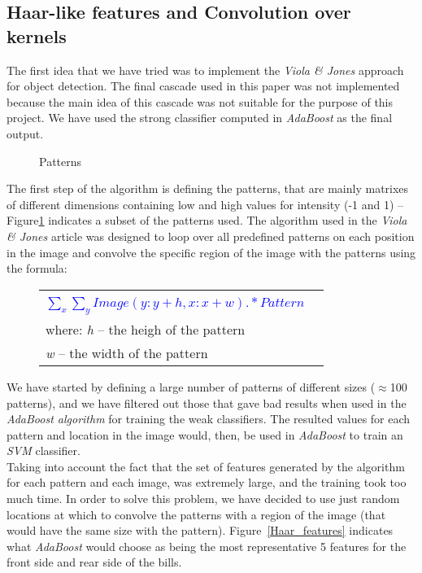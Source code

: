 \documentclass[11pt,twocolumn]{article}
\begin{document}
	\subsection{Haar-like features and Convolution over kernels}\label{sec:Haar}
	\hspace*{10px}The first idea that we have tried was to implement the \emph{Viola \& Jones} approach for object detection. The final cascade used in this paper was not implemented because the main idea of this cascade was not suitable for the purpose of this project. We have used the strong classifier computed in \emph{AdaBoost} as the final output.\\
\begin{figure}[!hbtp]
\caption{Patterns}
\label{patterns}
\end{figure}
	\hspace*{10px}The first step of the algorithm is defining the patterns, that are mainly matrixes of different dimensions containing low and high values for intensity (-1 and 1) -- Figure\ref{patterns} indicates a subset of the patterns used. The algorithm used in the \emph{Viola \& Jones} article was designed to loop over all predefined patterns on each position in the image and convolve the specific region of the image with the patterns using the formula:
\begin{figure}
\selectfont\small
\begin{tabular}{|lr|} \hline
	& \\[5pt]
	\textcolor{blue}{$\sum_x\sum_y Image(y:y+h,x:x+w) .* Pattern$} &\\[10pt]
	where: \emph{h} -- the heigh of the pattern &\\
	\hspace*{28px} \emph{w} -- the width of the pattern &\\[5pt] 
\hline 
\end{tabular}

\end{figure}
\hspace*{10px}We have started by defining a large number of patterns of different sizes ($\approx$100 patterns), and we have filtered out those that gave bad results when used in the \emph{AdaBoost algorithm} for training the weak classifiers. The resulted values for each pattern and location in the image would, then, be used in \emph{AdaBoost} to train an \emph{SVM} classifier.\\
\hspace*{10px}Taking into account the fact that the set of features generated by the algorithm for each pattern and each image, was extremely large, and the training took too much time. In order to solve this problem, we have decided to use just random locations at which to convolve the patterns with a region of the image (that would have the same size with the pattern). Figure~\ref{Haar_features} indicates what \emph{AdaBoost} would choose as being the most representative 5 features for the front side and rear side of the bills.\\
\end{document}
